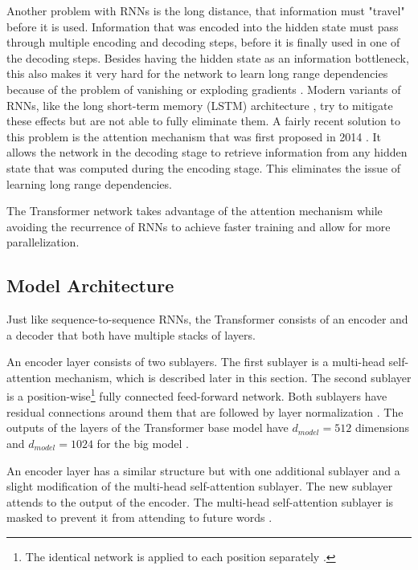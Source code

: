 Another problem with RNNs is the long distance, that information must "travel" before it is used. %
Information that was encoded into the hidden state must pass through multiple encoding and decoding steps, before it is finally used in one of the decoding steps.
Besides having the hidden state as an information bottleneck, this also makes it very hard for the network to learn long range dependencies because of the problem of vanishing or exploding gradients \cite{Hochreiter01gradientflow}. %
Modern variants of RNNs, like the long short-term memory (LSTM) architecture \cite{Hochreiter1997}, try to mitigate these effects but are not able to fully eliminate them.
A fairly recent solution to this problem is the attention mechanism that was first proposed in 2014 \cite{1409.0473}.
It allows the network in the decoding stage to retrieve information from any hidden state that was computed during the encoding stage.
This eliminates the issue of learning long range dependencies.

The Transformer network takes advantage of the attention mechanism while avoiding the recurrence of RNNs to achieve faster training and allow for more parallelization.

\subsection{Model Architecture}\label{ssec:transformer-model-architecture}

Just like sequence-to-sequence RNNs, the Transformer consists of an encoder and a decoder that both have multiple stacks of layers.

An encoder layer consists of two sublayers.
The first sublayer is a multi-head self-attention mechanism, which is described later in this section.
The second sublayer is a position-wise\footnote{The identical network is applied to each position separately \cite[p.~5]{1706.03762}.} fully connected feed-forward network.
Both sublayers have residual connections \cite{1512.03385} around them that are followed by layer normalization \cite{1607.06450}.
The outputs of the layers of the Transformer base model have $d_{model}=512$ dimensions and $d_{model}=1024$ for the big model \cite[p.~9]{1706.03762}.

An encoder layer has a similar structure but with one additional sublayer and a slight modification of the multi-head self-attention sublayer.
The new sublayer attends to the output of the encoder.
The multi-head self-attention sublayer is masked to prevent it from attending to future words \cite[p.~3]{1706.03762}.

